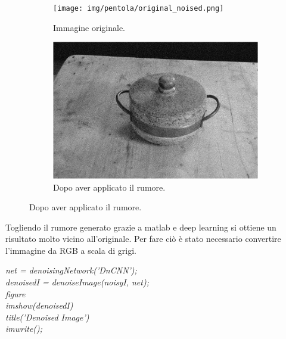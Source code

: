 \documentclass[12pt]{report}
\begin{document}
\begin{figure}[H]
  \centering
  \begin{subfigure}[b]{0.45\linewidth}
    \centering
    \texttt{[image: img/pentola/original\_noised.png]}
    \caption{Immagine originale.}
  \end{subfigure}
  \begin{subfigure}[b]{0.45\linewidth}
    \centering
    \includegraphics[width=\linewidth]{img/pentola/noised_image.png}
    \caption{Dopo aver applicato il rumore.}
  \end{subfigure}
\end{figure}

Togliendo il rumore generato grazie a matlab e deep learning si ottiene un risultato molto vicino all'originale. Per fare ci\`o è stato necessario convertire l'immagine da RGB a scala di grigi.

\textit{net = denoisingNetwork('DnCNN');\\denoisedI = denoiseImage(noisyI, net);\\figure\\imshow(denoisedI)\\title('Denoised Image')\\imwrite();}
\end{document}
